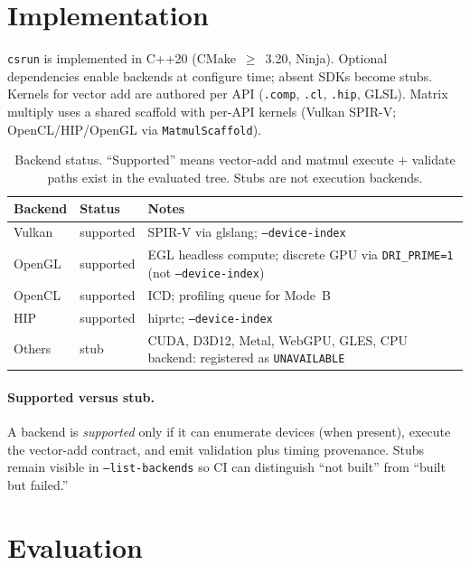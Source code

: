 \documentclass[11pt,a4paper]{article}
\newcommand{\csrun}{\texttt{csrun}\xspace}
\begin{document}
\section{Implementation}
\label{sec:impl}

\csrun is implemented in C++20 (CMake~$\geq$~3.20, Ninja). Optional
dependencies enable backends at configure time; absent SDKs become stubs.
Kernels for vector add are authored per API
(\texttt{.comp}, \texttt{.cl}, \texttt{.hip}, GLSL). Matrix multiply uses a
shared scaffold with per-API kernels (Vulkan SPIR-V; OpenCL/HIP/OpenGL via
\texttt{MatmulScaffold}).

\begin{table}[t]
\centering
\small
\begin{tabular}{@{}p{2.2cm}p{2.2cm}p{7.8cm}@{}}
\toprule
Backend & Status & Notes \\
\midrule
Vulkan  & supported & SPIR-V via glslang; \texttt{--device-index} \\
OpenGL  & supported & EGL headless compute; discrete GPU via
                      \texttt{DRI\_PRIME=1} (not \texttt{--device-index}) \\
OpenCL  & supported & ICD; profiling queue for Mode~B \\
HIP     & supported & hiprtc; \texttt{--device-index} \\
Others  & stub & CUDA, D3D12, Metal, WebGPU, GLES, CPU backend:
                 registered as \texttt{UNAVAILABLE} \\
\bottomrule
\end{tabular}
\caption{Backend status. ``Supported'' means vector-add and matmul execute +
validate paths exist in the evaluated tree. Stubs are not execution backends.}
\label{tab:backends}
\end{table}
\FloatBarrier

\paragraph{Supported versus stub.}
A backend is \emph{supported} only if it can enumerate devices (when present),
execute the vector-add contract, and emit validation plus timing provenance.
Stubs remain visible in \texttt{--list-backends} so CI can distinguish
``not built'' from ``built but failed.''

\section{Evaluation}
\label{sec:eval}
\end{document}
